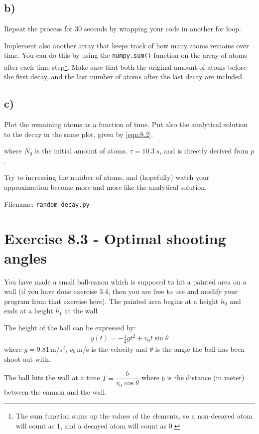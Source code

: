 \documentclass[10pt,a4paper]{article}
\begin{document}
\subsection*{b)}
Repeat the process for 30 seconds by wrapping your code in another for loop.

Implement also another array that keeps track of how many atoms remains over time. You can do this by using the \texttt{numpy.sum()} function on the array of atoms after each time-step\footnote{The sum function sums up the values of the elements, so a non-decayed atom will count as 1, and a decayed atom will count as 0.}. Make sure that both the original amount of atoms before the first decay, and the last number of atoms after the last decay are included.

\subsection*{c)}
Plot the remaining atoms as a function of time. Put also the analytical solution to the decay in the same plot, given by \ref{eqn:8.2}.

where $N_0$ is the initial amount of atoms. $\tau = \SI{10.3}{s}$, and is directly derived from $p$.

Try to increasing the number of atoms, and (hopefully) watch your approximation become more and more like the analytical solution.

Filename: \texttt{random\_decay.py}



\section*{Exercise 8.3 - Optimal shooting angles}
You have made a small ball-canon which is supposed to hit a painted area on a wall (if you have done exercise 3.4, then you are free to use and modify your program from that exercise here). The painted area begins at a height $h_0$ and ends at a height $h_1$ at the wall. 

The height of the ball can be expressed by: 
\begin{align*}
y(t) =  -\frac{1}{2}g t^2 + v_0t\sin\theta
\end{align*}
where $g = 9.81\,\mathrm{m/s^2}$, $v_0\,$m/s is the velocity and $\theta$ is the angle the ball has been shoot out with. 

The ball hits the wall at a time $T = \dfrac{b }{v_0\cos\theta}$ where $b$ is the distance (in meter) between the cannon and the wall. 
\end{document}

